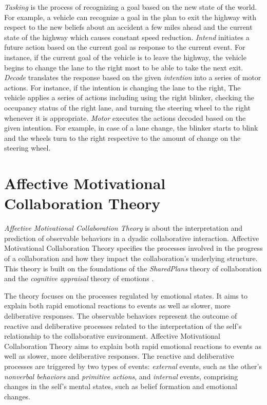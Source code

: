\documentclass[journal, 11pt]{IEEEtran}
\begin{document}
\textit{Tasking} is the process of recognizing a goal based on the new state of
the world. For example, a vehicle can recognize a goal in the plan to exit the
highway with respect to the new beliefs about an accident a few miles ahead and
the current state of the highway which causes constant speed reduction.
\textit{Intend} initiates a future action based on the current goal as response
to the current event. For instance, if the current goal of the vehicle is to
leave the highway, the vehicle begins to change the lane to the right most to be
able to take the next exit. \textit{Decode} translates the response based on the
given \textit{intention} into a series of motor actions. For instance, if the
intention is changing the lane to the right, The vehicle applies a series of
actions including using the right blinker, checking the occupancy status of the
right lane, and turning the steering wheel to the right whenever it is
appropriate. \textit{Motor} executes the actions decoded based on the given
intention. For example, in case of a lane change, the blinker starts to blink
and the wheels turn to the right respective to the amount of change on the
steering wheel.

\section{{\fontsize{11.5}{9}\selectfont Affective Motivational Collaboration
Theory}}
\label{sec:amct}

\textit{Affective Motivational Collaboration Theory}
\cite{shayganfar:theory-overview} is about the interpretation and prediction of
observable behaviors in a dyadic collaborative interaction. Affective
Motivational Collaboration Theory specifies the processes involved in the
progress of a collaboration and how they impact the collaboration's underlying
structure. This theory is built on the foundations of the \textit{SharedPlans}
theory of collaboration \cite{grosz:plans-discourse} and the \textit{cognitive
appraisal} theory of emotions \cite{gratch:domain-independent}.

The theory focuses on the processes regulated by emotional states. It aims to
explain both rapid emotional reactions to events as well as slower, more
deliberative responses. The observable behaviors represent the outcome of
reactive and deliberative processes related to the interpretation of the self's
relationship to the collaborative environment. Affective Motivational
Collaboration Theory aims to explain both rapid emotional reactions to events as
well as slower, more deliberative responses. The reactive and deliberative
processes are triggered by two types of events: \textit{external} events, such
as the other's \textit{nonverbal behaviors} and \textit{primitive actions}, and
\textit{internal} events, comprising changes in the self's mental states, such
as belief formation and emotional changes.
\end{document}
